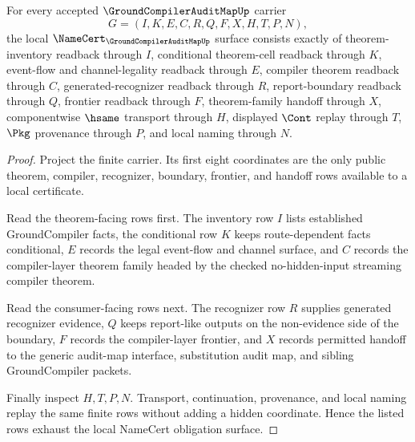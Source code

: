 \begin{theorem}
\label{thm:ground-compiler-audit-map-namecert-obligations}
For every accepted $\GroundCompilerAuditMapUp$ carrier
$$
G=(I,K,E,C,R,Q,F,X,H,T,P,N),
$$
the local $\NameCert_{\GroundCompilerAuditMapUp}$ surface consists exactly of theorem-inventory readback through $I$, conditional theorem-cell readback through $K$, event-flow and channel-legality readback through $E$, compiler theorem readback through $C$, generated-recognizer readback through $R$, report-boundary readback through $Q$, frontier readback through $F$, theorem-family handoff through $X$, componentwise $\hsame$ transport through $H$, displayed $\Cont$ replay through $T$, $\Pkg$ provenance through $P$, and local naming through $N$.
\end{theorem}
\begin{proof}
Project the finite carrier. Its first eight coordinates are the only public theorem, compiler, recognizer, boundary, frontier, and handoff rows available to a local certificate.

Read the theorem-facing rows first. The inventory row $I$ lists established GroundCompiler facts, the conditional row $K$ keeps route-dependent facts conditional, $E$ records the legal event-flow and channel surface, and $C$ records the compiler-layer theorem family headed by the checked no-hidden-input streaming compiler theorem.

Read the consumer-facing rows next. The recognizer row $R$ supplies generated recognizer evidence, $Q$ keeps report-like outputs on the non-evidence side of the boundary, $F$ records the compiler-layer frontier, and $X$ records permitted handoff to the generic audit-map interface, substitution audit map, and sibling GroundCompiler packets.

Finally inspect $H,T,P,N$. Transport, continuation, provenance, and local naming replay the same finite rows without adding a hidden coordinate. Hence the listed rows exhaust the local NameCert obligation surface.
\end{proof}

